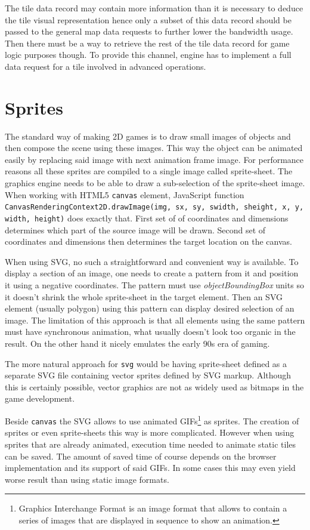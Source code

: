 \documentclass[11pt,oneside, final]{fithesis2}
\begin{document}
The tile data record may contain more information than it is necessary to deduce the tile visual representation hence only a subset of this data record should be passed to the general map data requests to further lower the bandwidth usage. Then there must be a way to retrieve the rest of the tile data record for game logic purposes though. To provide this channel, engine has to implement a full data request for a tile involved in advanced operations.

\section{Sprites}
The standard way of making 2D games is to draw small images of objects and then compose the scene using these images. This way the object can be animated easily by replacing said image with next animation frame image. For performance reasons all these sprites are compiled to a single image called sprite-sheet.\cite{pagella} The graphics engine needs to be able to draw a sub-selection of the sprite-sheet image. When working with HTML5 \texttt{canvas} element, JavaScript function \texttt{CanvasRenderingContext2D.drawImage(img, sx, sy, swidth, sheight, x, y, width, height)} does exactly that\cite{canvasdrawimage}. First set of of coordinates and dimensions determines which part of the source image will be drawn. Second set of coordinates and dimensions then determines the target location on the canvas.

When using SVG, no such a straightforward and convenient way is available. To display a section of an image, one needs to create a pattern from it and position it using a negative coordinates. The pattern must use \emph{objectBoundingBox} units so it doesn't shrink the whole sprite-sheet in the target element. Then an SVG element (usually polygon) using this pattern can display desired selection of an image. The limitation of this approach is that all elements using the same pattern must have synchronous animation, what usually doesn't look too organic in the result. On the other hand it nicely emulates the early 90s era of gaming.

The more natural approach for \texttt{svg} would be having sprite-sheet defined as a separate SVG file containing vector sprites defined by SVG markup. Although this is certainly possible, vector graphics are not as widely used as bitmaps in the game development.

Beside \texttt{canvas} the SVG allows to use animated GIFs\footnote{Graphics Interchange Format is an image format that allows to contain a series of images that are displayed in sequence to show an animation\cite{gifstandard}.} as sprites. The creation of sprites or even sprite-sheets this way is more complicated. However when using sprites that are already animated, execution time needed to animate static tiles can be saved. The amount of saved time of course depends on the browser implementation and its support of said GIFs. In some cases this may even yield worse result than using static image formats.
\end{document}
